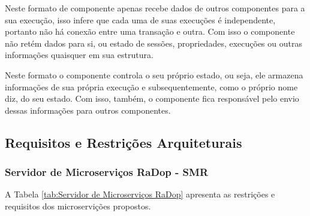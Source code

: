 Neste formato de componente apenas recebe dados de outros componentes
para a sua execução, isso infere que cada uma de suas execuções é
independente, portanto não há conexão entre uma transação e outra. Com
isso o componente não retém dados para si, ou estado de sessões,
propriedades, execuções ou outras informações quaisquer em sua
estrutura.

\label{statefull}

Neste formato o componente controla o seu próprio estado, ou seja, ele
armazena informações de sua própria execução e subsequentemente, como o
próprio nome diz, do seu estado. Com isso, também, o componente fica
responsável pelo envio dessas informações para outros componentes.

\subsection{Requisitos e Restrições Arquiteturais}\label{requisitos-e-restricoes-arquiteturais}

\subsubsection{Servidor de Microserviços RaDop - SMR}\label{req-servidor-de-microservicos-radop---smr}

A Tabela \ref{tab:Servidor de Microserviços RaDop} apresenta as restrições e requisitos dos microservições propostos.

